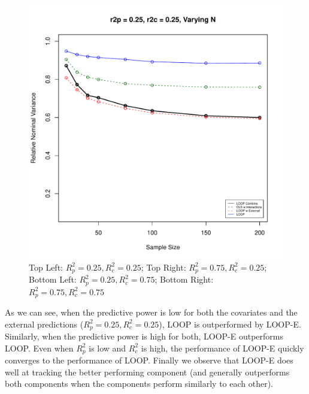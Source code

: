 \begin{figure}[H]
	\includegraphics[width=.49\linewidth,page = 4]{images/sampsize.pdf} \quad
	\caption{Top Left: $R^2_p = 0.25, R^2_c = 0.25$; Top Right: $R^2_p = 0.75, R^2_c = 0.25$; Bottom Left: $R^2_p = 0.25, R^2_c = 0.75$; Bottom Right: $R^2_p = 0.75, R^2_c = 0.75$}  
\end{figure}
As we can see, when the predictive power is low for both the covariates and the external predictions ($R^2_p = 0.25, R^2_c = 0.25$), LOOP is outperformed by LOOP-E. Similarly, when the predictive power is high for both, LOOP-E outperforms LOOP. Even when $R^2_p$ is low and $R^2_c$ is high, the performance of LOOP-E quickly converges to the performance of LOOP. Finally we observe that LOOP-E does well at tracking the better performing component (and generally outperforms both components when the components perform similarly to each other).

